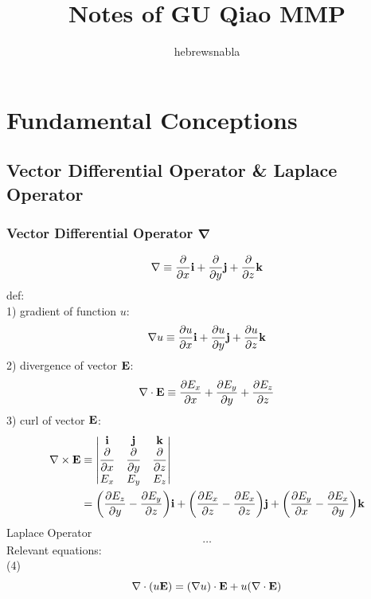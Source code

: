 \documentclass[UTF8]{ctexart} %
\title{Notes of GU Qiao MMP}
\author{hebrewsnabla}
\newcommand{\dis}{\displaystyle}
\numberwithin{equation}{section}
\begin{document}
\maketitle


\section{Fundamental Conceptions}
\setcounter{subsection}{1}
\subsection{Vector Differential Operator \& Laplace Operator}
\subsubsection{Vector Differential Operator $\mathbf{\nabla}$}
\begin{equation}\label{key}
\nabla\equiv\pdv{x}\vb{i}+\pdv{y}\vb{j}+\pdv{z}\vb{k}
\end{equation}
def:\\
1) gradient of function $u$:\\
\begin{equation}\label{key}
\nabla u\equiv\pdv{u}{x}\vb{i}+\pdv{u}{y}\vb{j}+\pdv{u}{z}\vb{k}
\end{equation}
2) divergence of vector $\vb{E}$:\\
\begin{equation}\label{key}
\nabla\cdot \vb{E} \equiv \pdv{E_x}{x}+\pdv{E_y}{y}+\pdv{E_z}{z}
\end{equation}
3) curl of vector $\vb{E}$:\\
\begin{equation}\label{key}
\begin{aligned}
\nabla\times\vb{E} & \equiv
\mdet{\vb{i} & \vb{j} & \vb{k}\\
\dis\pdv{x} & \dis\pdv{y} & \dis\pdv{z}\\
E_x & E_y & E_z}\\
& = \qty(\pdv{E_z}{y}-\pdv{E_y}{z})\vb{i}+\qty(\pdv{E_x}{z}-\pdv{E_x}{z})\vb{j}+\qty(\pdv{E_y}{x}-\pdv{E_x}{y})\vb{k}
\end{aligned}
\end{equation}
Laplace Operator
\begin{equation}\label{key}
\ldots
\end{equation}
Relevant equations:\\
(4) \begin{equation}\label{key}
\nabla\cdot(u\vb{E})=(\nabla u)\cdot \vb{E}+u(\nabla\cdot \vb{E})
\end{equation}
\end{document}
